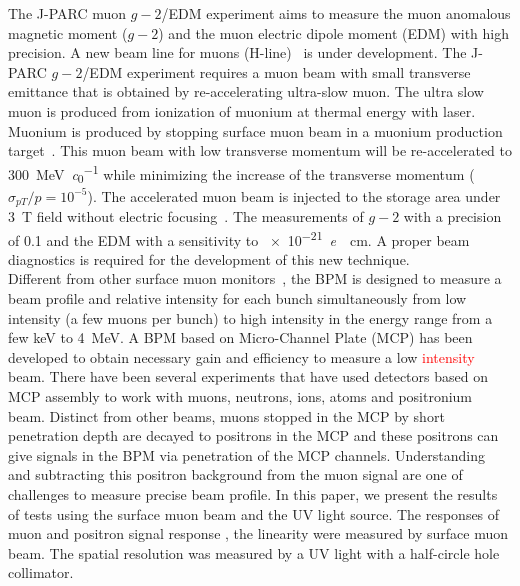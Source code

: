 \documentclass[preprint,3p,twocolumn]{elsarticle}
\begin{document}
The J-PARC muon $g-2$/EDM experiment \cite{E34} aims to measure the muon anomalous magnetic moment ($g-2$) and the muon electric dipole moment (EDM) with high precision.
A new beam line for muons (H-line)~\cite{h-line} is under development.
The J-PARC $g-2$/EDM experiment requires a muon beam with small transverse emittance that is obtained by re-accelerating ultra-slow muon. %
The ultra slow muon is produced from ionization of muonium at thermal energy with laser.
Muonium is produced by stopping surface muon beam in a muonium production target~\cite{muonium}.  
This muon beam with low transverse momentum will be re-accelerated to \SI{300}{\MeV\per\clight} \cite{IH} while minimizing the increase of the transverse momentum ($\sigma_{pT}/p = 10^{-5}$).
The accelerated muon beam is injected to the storage area under \SI{3}{\tesla} field without electric focusing~\cite{injection}. The measurements of $g-2$ with a precision of \SI{0.1}{\ppm} and the EDM with a sensitivity to \SI{e-21}{\elementarycharge \cdot \cm}.  A proper beam diagnostics is required for the development of this new technique. \\
Different from other surface muon monitors~\cite{muon_bpm1}, the BPM is designed to measure a beam profile and relative intensity for each bunch simultaneously from low intensity (a few muons per bunch) to high intensity in the energy range from a few \si{keV} to \SI{4}{\MeV}.
A BPM based on Micro-Channel Plate (MCP) has been developed to obtain necessary gain and efficiency to measure a low \textcolor{red}{intensity} beam.
There have been several experiments that have used detectors based on MCP assembly to work with muons, neutrons, ions, atoms and positronium~\cite{muon_bpm2, neutron, Ps} beam.
Distinct from other beams, muons stopped in the MCP by short penetration depth are decayed to positrons in the MCP and these positrons can give signals in the BPM via penetration of the MCP channels. 
Understanding and subtracting this positron background from the muon signal are one of challenges to measure precise beam profile. %
In this paper, we present the results of tests using the surface muon beam and the UV light source.
The responses of muon and positron signal response %
, the linearity%
were measured by surface muon beam.
The spatial resolution was measured by a UV light with a half-circle hole collimator.
\end{document}

